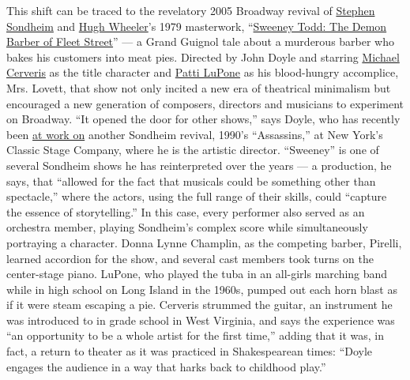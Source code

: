 This shift can be traced to the revelatory 2005 Broadway revival of
\href{https://www.nytimes.com/topic/person/stephen-sondheim}{Stephen
Sondheim} and
\href{https://www.nytimes.com/1987/07/28/obituaries/hugh-wheeler-award-winning-playwright.html}{Hugh
Wheeler}'s 1979 masterwork,
``\href{https://www.nytimes.com/2005/12/11/theater/sweeney-todds-game-of-musical-chairs.html}{Sweeney
Todd: The Demon Barber of Fleet Street}'' --- a Grand Guignol tale about
a murderous barber who bakes his customers into meat pies. Directed by
John Doyle and starring
\href{https://www.nytimes.com/2016/05/29/realestate/michael-cerveriss-fun-home-in-chelsea.html}{Michael
Cerveris} as the title character and
\href{https://www.nytimes.com/topic/person/patti-lupone}{Patti LuPone}
as his blood-hungry accomplice, Mrs. Lovett, that show not only incited
a new era of theatrical minimalism but encouraged a new generation of
composers, directors and musicians to experiment on Broadway. ``It
opened the door for other shows,'' says Doyle, who has recently been
\href{https://www.nytimes.com/2019/03/20/theater/john-doyle-assassins.html}{at
work on} another Sondheim revival, 1990's ``Assassins,'' at New York's
Classic Stage Company, where he is the artistic director. ``Sweeney'' is
one of several Sondheim shows he has reinterpreted over the years --- a
production, he says, that ``allowed for the fact that musicals could be
something other than spectacle,'' where the actors, using the full range
of their skills, could ``capture the essence of storytelling.'' In this
case, every performer also served as an orchestra member, playing
Sondheim's complex score while simultaneously portraying a character.
Donna Lynne Champlin, as the competing barber, Pirelli, learned
accordion for the show, and several cast members took turns on the
center-stage piano. LuPone, who played the tuba in an all-girls marching
band while in high school on Long Island in the 1960s, pumped out each
horn blast as if it were steam escaping a pie. Cerveris strummed the
guitar, an instrument he was introduced to in grade school in West
Virginia, and says the experience was ``an opportunity to be a whole
artist for the first time,'' adding that it was, in fact, a return to
theater as it was practiced in Shakespearean times: ``Doyle engages the
audience in a way that harks back to childhood play.''

